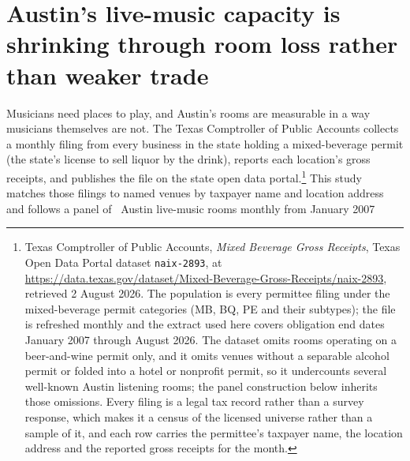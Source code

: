 \section{Austin's live-music capacity is shrinking through room loss rather than weaker trade}
\label{sec:venues}

Musicians need places to play, and Austin's rooms are measurable in a way
musicians themselves are not. The Texas Comptroller of Public Accounts collects
a monthly filing from every business in the state holding a mixed-beverage
permit (the state's license to sell liquor by the drink), reports each
location's gross receipts, and publishes the file on the state open data
portal.\footnote{Texas Comptroller of Public Accounts, \textit{Mixed Beverage
Gross Receipts}, Texas Open Data Portal dataset \texttt{naix-2893}, at
\url{https://data.texas.gov/dataset/Mixed-Beverage-Gross-Receipts/naix-2893},
retrieved 2 August 2026. The population is every permittee filing under the
mixed-beverage permit categories (MB, BQ, PE and their subtypes); the file is
refreshed monthly and the extract used here covers obligation end dates January
2007 through August 2026. The dataset omits rooms operating on a beer-and-wine
permit only, and it omits venues without a separable alcohol permit or folded
into a hotel or nonprofit permit, so it undercounts several well-known Austin
listening rooms; the panel construction below inherits those omissions. Every
filing is a legal tax record rather than a survey response, which makes it a
census of the licensed universe rather than a sample of it, and each row carries
the permittee's taxpayer name, the location address and the reported gross
receipts for the month.} This study matches those filings to named venues by
taxpayer name and location address and follows a panel of
\NVenuePanelIsCurated\ Austin live-music rooms monthly from January 2007
